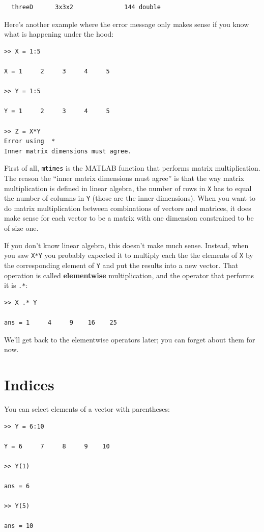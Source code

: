 \documentclass[
]{book}
\begin{document}
\begin{verbatim}          
  threeD      3x3x2              144 double                     
\end{verbatim}

Here's another example where the error message only makes sense
if you know what is happening under the hood:

\begin{verbatim}
>> X = 1:5

X = 1     2     3     4     5

>> Y = 1:5

Y = 1     2     3     4     5

>> Z = X*Y
Error using  *
Inner matrix dimensions must agree.
\end{verbatim}

First of all, {\tt mtimes} is the MATLAB function that performs
matrix multiplication.  The reason the ``inner matrix dimensions
must agree'' is that the way matrix multiplication is defined in
linear algebra, the number of rows in {\tt X} has to equal the
number of columns in {\tt Y} (those are the inner dimensions).
When you want to do matrix multiplication between combinations
of vectors and matrices, it does make sense for each vector to
be a matrix with one dimension constrained to be of size one.  

If you don't know linear algebra, this doesn't make much sense.
Instead, when you saw {\tt X*Y} you probably expected it to multiply each
the the elements of {\tt X} by the corresponding element of
{\tt Y} and put the results into a new vector.  That operation
is called {\bf elementwise} multiplication, and the operator that
performs it is {\tt .*}:

\begin{verbatim}
>> X .* Y

ans = 1     4     9    16    25
\end{verbatim}

We'll get back to the elementwise operators later; you can
forget about them for now.


\section{Indices}

You can select elements of a vector with parentheses:

\begin{verbatim}
>> Y = 6:10

Y = 6     7     8     9    10

>> Y(1)

ans = 6

>> Y(5)

ans = 10
\end{verbatim}
\end{document}
